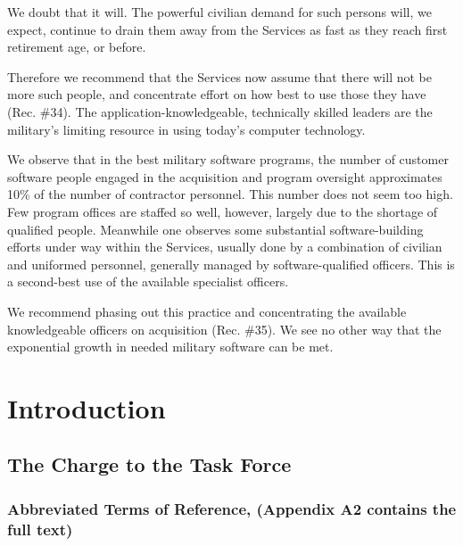 \documentclass[11pt,final]{article}
\begin{document}
We doubt that it will. The powerful civilian demand for such persons will, we
expect, continue to drain them away from the Services as fast as they reach
first retirement age, or before. %

Therefore we recommend that the Services now assume that there will not be more
such people, and concentrate effort on how best to use those they have (Rec.
\#34). The application-knowledgeable, technically skilled leaders are the
military’s limiting resource in using today’s computer technology.

We observe that in the best military software programs, the number of customer
software people engaged in the acquisition and program oversight approximates
10\% of the number of contractor personnel. This number does not seem too high.
Few program offices are staffed so well, however, largely due to the shortage
of qualified people. Meanwhile one observes some substantial software-building
efforts under way within the Services, usually done by a combination of
civilian and uniformed personnel, generally managed by software-qualified
officers. This is a second-best use of the available specialist officers.

We recommend phasing out this practice and concentrating the available
knowledgeable officers on acquisition (Rec. \#35). We see no other way that the
exponential growth in needed military software can be met.

\section{Introduction}

\subsection{The Charge to the Task Force}

\subsubsection*{Abbreviated Terms of Reference, (Appendix A2 contains the full text)}
\end{document}

